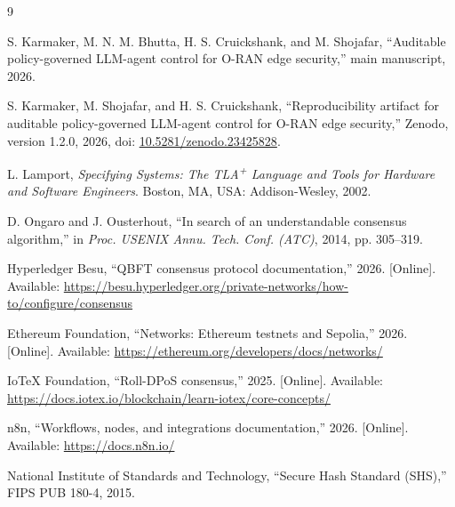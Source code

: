 \documentclass[journal]{IEEEtran}
\newif\ifshowrevisions
\newcommand{\rev}[1]{{\ifshowrevisions\color{blue}\else\color{black}\fi #1}}
\begin{document}
\begin{thebibliography}{9}
\scriptsize

\rev{S. Karmaker, M. N. M. Bhutta, H. S. Cruickshank, and M. Shojafar}, ``Auditable
policy-governed LLM-agent control for O-RAN edge security,'' main manuscript,
2026.

\rev{S. Karmaker, M. Shojafar, and H. S. Cruickshank, ``Reproducibility artifact
for auditable policy-governed LLM-agent control for O-RAN edge security,''
Zenodo, version 1.2.0, 2026, doi:
\url{10.5281/zenodo.23425828}.}

L. Lamport, \emph{Specifying Systems: The TLA\textsuperscript{+} Language and
Tools for Hardware and Software Engineers}. Boston, MA, USA: Addison-Wesley,
2002.

D. Ongaro and J. Ousterhout, ``In search of an understandable consensus
algorithm,'' in \emph{Proc. USENIX Annu. Tech. Conf. (ATC)}, 2014,
pp. 305--319.

Hyperledger Besu, ``QBFT consensus protocol documentation,'' 2026. [Online].
Available:
\url{https://besu.hyperledger.org/private-networks/how-to/configure/consensus}

Ethereum Foundation, ``Networks: Ethereum testnets and Sepolia,'' 2026.
[Online]. Available: \url{https://ethereum.org/developers/docs/networks/}

IoTeX Foundation, ``Roll-DPoS consensus,'' 2025. [Online]. Available:
\url{https://docs.iotex.io/blockchain/learn-iotex/core-concepts/}

n8n, ``Workflows, nodes, and integrations documentation,'' 2026. [Online].
Available: \url{https://docs.n8n.io/}

National Institute of Standards and Technology, ``Secure Hash Standard
(SHS),'' FIPS PUB 180-4, 2015.

\end{thebibliography}
\end{document}
